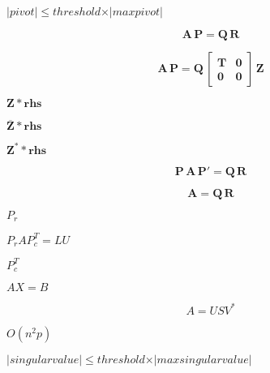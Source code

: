 \documentclass{article}
\begin{document}
$ \vert pivot \vert \leqslant threshold \times \vert maxpivot \vert $
\pagebreak

\[
 \mathbf{A} \, \mathbf{P} = \mathbf{Q} \, \mathbf{R}
\]
\pagebreak

\[
 \mathbf{A} \, \mathbf{P} = \mathbf{Q} \,
                    \begin{bmatrix} \mathbf{T} &  \mathbf{0} \\
                                    \mathbf{0} & \mathbf{0} \end{bmatrix} \, \mathbf{Z}
\]
\pagebreak

$ \mathbf{Z} * \mathbf{rhs} $
\pagebreak

$ \mathbf{\overline Z} * \mathbf{rhs} $
\pagebreak

$ \mathbf{Z}^* * \mathbf{rhs} $
\pagebreak

\[
 \mathbf{P} \, \mathbf{A} \, \mathbf{P}' = \mathbf{Q} \, \mathbf{R}
\]
\pagebreak

\[
 \mathbf{A} = \mathbf{Q} \, \mathbf{R}
\]
\pagebreak

$ P_r $
\pagebreak

$P_r A P_c^T = L U$
\pagebreak

$ P_c^T $
\pagebreak

$ A X = B $
\pagebreak

\[ A = U S V^* \]
\pagebreak

$ O(n^2p) $
\pagebreak

$ \vert singular value \vert \leqslant threshold \times \vert max singular value \vert $
\pagebreak
\end{document}
